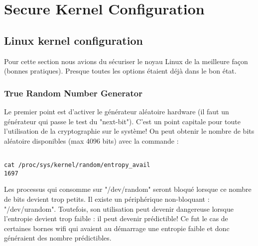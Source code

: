 
\chapter{Secure Kernel Configuration} %

\label{Chapitre 3} %


\section{Linux kernel configuration}
Pour cette section nous avions du sécuriser le noyau Linux de la meilleure façon (bonnes pratiques). Presque toutes les options étaient déjà dans le bon état.

\subsection{True Random Number Generator}
Le premier point est d'activer le générateur aléatoire hardware (il faut un générateur qui passe le test du "next-bit"). C'est un point capitale pour toute l'utilisation de la cryptographie sur le système! On peut obtenir le nombre de bits aléatoire disponibles (max 4096 bits) avec la commande :

\begin{lstlisting}[frame=single,style=Console]  % Start your code-block

cat /proc/sys/kernel/random/entropy_avail
1697
\end{lstlisting}
Les processus qui consomme sur "/dev/random" seront bloqué lorsque ce nombre de bits devient trop petits. Il existe un périphérique non-bloquant : "/dev/urandom". Toutefois, son utilisation peut devenir dangereuse lorsque l'entropie devient trop faible : il peut devenir prédictible! Ce fut le cas de certaines bornes wifi qui avaient au démarrage une entropie faible et donc généraient des nombre prédictibles.\\

